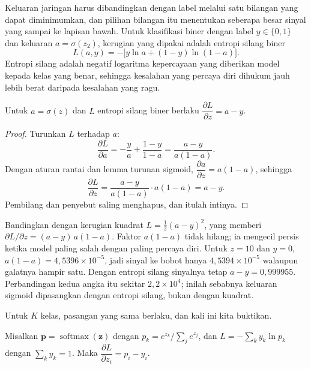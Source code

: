 Keluaran jaringan harus dibandingkan dengan label melalui satu bilangan yang dapat
diminimumkan, dan pilihan bilangan itu menentukan seberapa besar sinyal yang sampai ke
lapisan bawah. Untuk klasifikasi biner dengan label $y\in\{0,1\}$ dan keluaran
$a=\sigma(z_{2})$, kerugian yang dipakai adalah entropi silang biner
\[
  L(a,y)=-\bigl[y\ln a+(1-y)\ln(1-a)\bigr].
\]
Entropi silang adalah negatif logaritma kepercayaan yang diberikan model kepada kelas yang
benar, sehingga kesalahan yang percaya diri dihukum jauh lebih berat daripada kesalahan yang
ragu.


\begin{proposisi}
Untuk $a=\sigma(z)$ dan $L$ entropi silang biner berlaku
$\dfrac{\partial L}{\partial z}=a-y$.
\end{proposisi}

\begin{proof}
Turunkan $L$ terhadap $a$:
\[
  \frac{\partial L}{\partial a}=-\frac{y}{a}+\frac{1-y}{1-a}
  =\frac{a-y}{a(1-a)} .
\]
Dengan aturan rantai dan lemma turunan sigmoid,
$\dfrac{\partial a}{\partial z}=a(1-a)$, sehingga
\[
  \frac{\partial L}{\partial z}=\frac{a-y}{a(1-a)}\cdot a(1-a)=a-y .
\]
Pembilang dan penyebut saling menghapus, dan itulah intinya.
\end{proof}

Bandingkan dengan kerugian kuadrat $L=\tfrac12(a-y)^{2}$, yang memberi
$\partial L/\partial z=(a-y)\,a(1-a)$. Faktor $a(1-a)$ tidak hilang; ia mengecil persis ketika model paling salah dengan paling percaya diri. Untuk $z=10$ dan $y=0$, $a(1-a)=4{,}5396\times10^{-5}$, jadi sinyal ke bobot hanya $4{,}5394\times10^{-5}$ walaupun galatnya hampir satu. Dengan entropi silang sinyalnya
tetap $a-y=0{,}999955$. Perbandingan kedua angka itu sekitar $2{,}2\times10^{4}$; inilah
sebabnya keluaran sigmoid dipasangkan dengan entropi silang, bukan dengan kuadrat.

Untuk $K$ kelas, pasangan yang sama berlaku, dan kali ini kita buktikan.


\begin{proposisi}
Misalkan $\mathbf{p}=\operatorname{softmax}(\mathbf{z})$ dengan
$p_{k}=e^{z_{k}}/\sum_{j}e^{z_{j}}$, dan $L=-\sum_{k}y_{k}\ln p_{k}$ dengan
$\sum_{k}y_{k}=1$. Maka $\dfrac{\partial L}{\partial z_{i}}=p_{i}-y_{i}$.
\end{proposisi}

